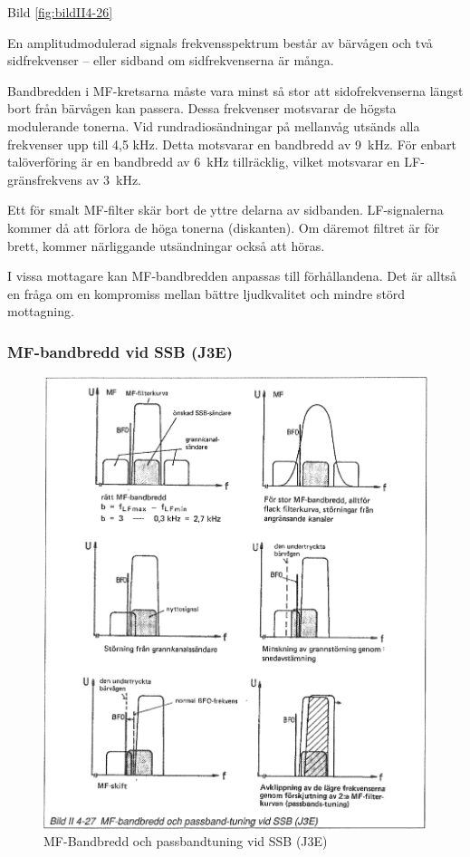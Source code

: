 Bild \ref{fig:bildII4-26}

En amplitudmodulerad signals frekvensspektrum består av bärvågen och
två sidfrekvenser -- eller sidband om sidfrekvenserna är många.

Bandbredden i MF-kretsarna måste vara minst så stor att
sidofrekvenserna längst bort från bärvågen kan passera. Dessa
frekvenser motsvarar de högsta modulerande tonerna. Vid
rundradiosändningar på mellanvåg utsänds alla frekvenser upp till 4,5
kHz.  Detta motsvarar en bandbredd av 9~kHz. För enbart talöverföring
är en bandbredd av 6~kHz tillräcklig, vilket motsvarar en
LF-gränsfrekvens av 3~kHz.

Ett för smalt MF-filter skär bort de yttre delarna av
sidbanden. LF-signalerna kommer då att förlora de höga tonerna
(diskanten). Om däremot filtret är för brett, kommer närliggande
utsändningar också att höras.

I vissa mottagare kan MF-bandbredden anpassas till förhållandena. Det
är alltså en fråga om en kompromiss mellan bättre ljudkvalitet och
mindre störd mottagning.

\subsubsection{MF-bandbredd vid SSB (J3E)}

\begin{figure}
  \includegraphics[width=\textwidth]{images/bild_2_4-27}
  \caption{MF-Bandbredd och passbandtuning vid SSB (J3E)}
  \label{fig:bildII4-27}
\end{figure}

